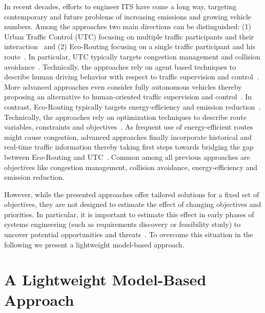 \documentclass[conference]{../cls/IEEEtran}
\begin{document}
In recent decades, efforts to engineer ITS have come a long way, targeting
contemporary and future problems of increasing emissions and growing vehicle numbers. Among the approaches two main directions can be distinguished: (1) Urban Traffic Control (UTC) focusing on multiple traffic participants and their interaction~\cite{Chen2010,Dresner2008} and (2) Eco-Routing focusing on a single traffic participant and his route~\cite{Ericsson2006,Boriboonsomsin2012}. In particular, UTC typically targets congestion management and collision avoidance~\cite{Chen2010}. Technically, the approaches rely on agent based techniques to describe human driving behavior with respect to traffic supervision and control~\cite{Chen2010}. More advanced approaches even consider fully autonomous vehicles thereby proposing an alternative to human-oriented traffic supervision and control~\cite{Dresner2008}. In contrast, Eco-Routing typically targets energy-efficiency and emission reduction~\cite{Ericsson2006}. Technically, the approaches rely on optimization techniques to describe route variables, constraints and objectives~\cite{Ericsson2006}. As frequent use of energy-efficient routes might cause congestion, advanced approaches finally incorporate historical and real-time traffic information thereby taking first steps towards bridging the gap between Eco-Routing and UTC~\cite{Boriboonsomsin2012}. Common among all previous approaches are objectives like congestion management, collision avoidance, energy-efficiency and emission reduction.

However, while the presented approaches offer tailored solutions for a fixed set
of objectives, they are not designed to estimate the effect of changing objectives and priorities. In particular, it is important to estimate this effect in early phases of systems engineering (such as requirements discovery or feasibility study) to uncover potential opportunities and threats~\cite{Whitten2005}. To overcome this situation in the following we present a lightweight model-based approach.

\section{A Lightweight Model-Based Approach}
\label{sec:approach}
\end{document}
